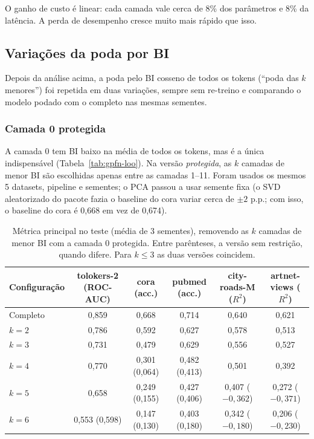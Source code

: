 \documentclass[12pt,a4paper]{article}
\newcommand{\ruim}[1]{\textcolor{red!70!black}{#1}}
\begin{document}
O ganho de custo é linear: cada camada vale cerca de 8\% dos parâmetros e 8\% da latência. A perda de desempenho cresce muito mais rápido que isso.

\subsection{Variações da poda por BI}

Depois da análise acima, a poda pelo BI cosseno de todos os tokens (``poda das $k$ menores'') foi repetida em duas variações, sempre sem re-treino e comparando o modelo podado com o completo nas mesmas sementes.

\subsubsection{Camada 0 protegida}

A camada 0 tem BI baixo na média de todos os tokens, mas é a única indispensável (Tabela~\ref{tab:gpfn-loo}). Na versão \emph{protegida}, as $k$ camadas de menor BI são escolhidas apenas entre as camadas 1--11. Foram usados os mesmos 5 datasets, pipeline e sementes; o PCA passou a usar semente fixa (o SVD aleatorizado do pacote fazia o baseline do cora variar cerca de $\pm 2$ p.p.; com isso, o baseline do cora é 0,668 em vez de 0,674).

\begin{table}[H]
\centering
\caption{Métrica principal no teste (média de 3 sementes), removendo as $k$ camadas de menor BI com a camada 0 protegida. Entre parênteses, a versão sem restrição, quando difere. Para $k \leq 3$ as duas versões coincidem.}
\label{tab:gpfn-protegida}
\setlength{\tabcolsep}{3pt}
\scriptsize
\begin{tabular}{@{}lccccc@{}}
\toprule
Configuração & tolokers-2 (ROC-AUC) & cora (acc.) & pubmed (acc.) & city-roads-M ($R^2$) & artnet-views ($R^2$) \\
\midrule
Completo & 0,859 & 0,668 & 0,714 & 0,640 & 0,621 \\
$k=2$ & 0,786 & 0,592 & 0,627 & 0,578 & 0,513 \\
$k=3$ & 0,731 & 0,479 & 0,629 & 0,556 & 0,527 \\
$k=4$ & 0,770 & 0,301 (\ruim{0,064}) & 0,482 (\ruim{0,413}) & 0,501 & 0,392 \\
$k=5$ & 0,658 & 0,249 (\ruim{0,155}) & 0,427 (\ruim{0,406}) & 0,407 (\ruim{$-0{,}362$}) & 0,272 (\ruim{$-0{,}371$}) \\
$k=6$ & 0,553 (0,598) & 0,147 (0,130) & 0,403 (0,180) & 0,342 (\ruim{$-0{,}180$}) & 0,206 (\ruim{$-0{,}230$}) \\
\bottomrule
\end{tabular}
\end{table}
\end{document}
